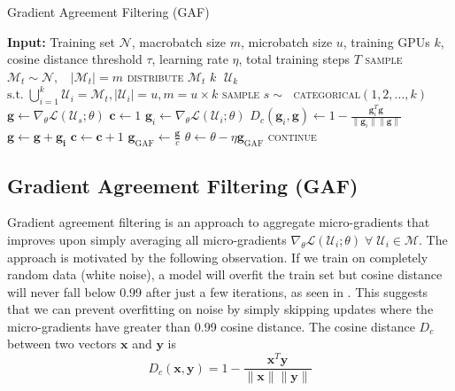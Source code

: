 \begin{algorithm}[h]
\caption{Gradient Agreement Filtering (GAF)}
\label{alg:gaf}
\begin{algorithmic}[1]
\STATE \textbf{Input:} Training set $\mathcal{N}$, macrobatch size $m$, microbatch size $u$, training GPUs $k$, cosine distance threshold $\tau$, learning rate $\eta$, total training steps $T$
    \STATE \textsc{sample} $\mathcal{M}_t \sim \mathcal{N}, \;$ {} $\; |\mathcal{M}_t| = m$
    \STATE \textsc{distribute} $\mathcal{M}_t $  $k \; $ $\mathcal{U}_k$
    \STATE \quad $\text{s.t.} \; \bigcup_{i=1}^{k} \mathcal{U}_{i} = \mathcal{M}_t, |\mathcal{U}_{i}| = u, m = u \times k$
    \STATE \textsc{sample} $s \sim \;$ \textsc{categorical}$(1, 2, \dots, k)$
    \STATE $\mathbf{g} \leftarrow \nabla_\theta \mathcal{L}(\mathcal{U}_s; \theta)$
    \STATE $\mathbf{c} \leftarrow 1$
        \STATE $\mathbf{g}_i \leftarrow \nabla_\theta \mathcal{L}(\mathcal{U}_i; \theta)$
        \STATE $D_c(\mathbf{g}_i,\mathbf{g}) \leftarrow 1 - \frac{\mathbf{g}_i^T \mathbf{g}}{\|\mathbf{g}_i\| \|\mathbf{g}\|}$
            \STATE $\mathbf{g} \leftarrow \mathbf{g} + \mathbf{g_i}$
            \STATE $\mathbf{c}   \leftarrow \mathbf{c} + 1$
        \ENDIF
            \STATE $\mathbf{g}_{\text{GAF}} \leftarrow \frac{\mathbf{g}}{c}$
            \STATE $\theta \leftarrow \theta - \eta \mathbf{g}_{\text{GAF}}$
        \ELSE
            \STATE \textsc{continue}
        \ENDIF
    \ENDFOR
\ENDFOR
\end{algorithmic}
\end{algorithm}

\subsection{Gradient Agreement Filtering (GAF)}

Gradient agreement filtering is an approach to aggregate micro-gradients that improves upon simply averaging all micro-gradients $\nabla_\theta \mathcal{L}(\mathcal{U}_i; \theta) \; \forall \; \mathcal{U}_i \in \mathcal{M}$. The approach is motivated by the following observation. If we train on completely random data (white noise), a model will overfit the train set but cosine distance will never fall below 0.99 after just a few iterations, as seen in . This suggests that we can prevent overfitting on noise by simply skipping updates where the micro-gradients have greater than 0.99 cosine distance. The cosine distance $D_c$ between two vectors $\mathbf{x}$ and $\mathbf{y}$ is
\begin{equation} \label{eq:cdist}
    D_c(\mathbf{x},\mathbf{y}) = 1 - \frac{\mathbf{x}^T\mathbf{y}}{\|\mathbf{x}\|\|\mathbf{y}\|}
\end{equation}

